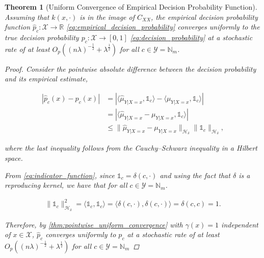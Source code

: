 \documentclass{article}
\newtheorem{theorem}{Theorem}[section]
\begin{document}
	\begin{theorem}[Uniform Convergence of Empirical Decision Probability Function]
		\label{thm:probability_convergence}
		Assuming that $k(x, \cdot)$ is in the image of $C_{XX}$, the empirical decision probability function $\hat{p}_{c} : \mathcal{X} \to \mathbb{R}$ \eqref{eq:empirical_decision_probability} converges uniformly to the true decision probability $p_{c} : \mathcal{X} \to [0, 1]$ \eqref{eq:decision_probability} at a stochastic rate of at least $O_{p}((n \lambda)^{-\frac{1}{2}} + \lambda^{\frac{1}{2}})$ for all $c \in \mathcal{Y} = \mathbb{N}_{m}$.
		
		\begin{proof}
			Consider the pointwise absolute difference between the decision probability and its empirical estimate,
			
			\begin{equation}
			\begin{aligned}
				| \hat{p}_{c}(x) - p_{c}(x) | &= | \langle \hat{\mu}_{Y | X = x}, \mathbb{1}_{c} \rangle - \langle \mu_{Y | X = x}, \mathbb{1}_{c} \rangle | \\
				&= | \langle \hat{\mu}_{Y | X = x} - \mu_{Y | X = x}, \mathbb{1}_{c} \rangle | \\
				&\leq \big\| \hat{\mu}_{Y | X = x} - \mu_{Y | X = x} \big\|_{\mathcal{H}_{\delta}} \big\| \mathbb{1}_{c} \big\|_{\mathcal{H}_{\delta}},
			\label{eq:decision_probability_error_upper_bound}
			\end{aligned}
			\end{equation}
			
			where the last inequality follows from the Cauchy–Schwarz inequality in a Hilbert space.
			
			From \eqref{eq:indicator_function}, since $\mathbb{1}_{c} = \delta(c, \cdot)$ and using the fact that $\delta$ is a reproducing kernel, we have that for all $c \in \mathcal{Y} = \mathbb{N}_{m}$.
			
			\begin{equation}
			\begin{aligned}
				\big\| \mathbb{1}_{c} \big\|_{\mathcal{H}_{\delta}}^{2} = \langle \mathbb{1}_{c}, \mathbb{1}_{c} \rangle = \langle \delta(c, \cdot), \delta(c, \cdot) \rangle = \delta(c, c) = 1.
			\label{eq:indicator_rkhs_norm}
			\end{aligned}
			\end{equation}
			
			Therefore, by \cref{thm:pointwise_uniform_convergence} with $\gamma(x) = 1$ independent of $x \in \mathcal{X}$, $\hat{p}_{c}$ converges uniformly to $p_{c}$ at a stochastic rate of at least $O_{p}((n \lambda)^{-\frac{1}{2}} + \lambda^{\frac{1}{2}})$ for all $c \in \mathcal{Y} = \mathbb{N}_{m}$
			

\end{proof}
\end{theorem}
\end{document}
